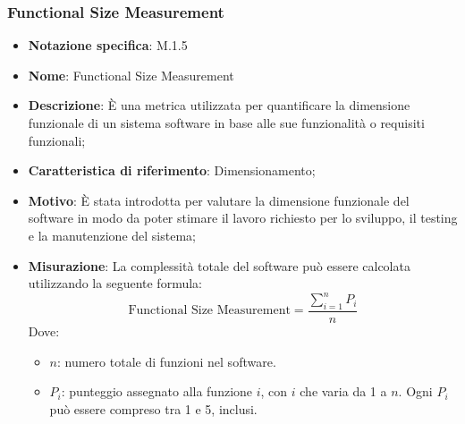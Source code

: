 \subsubsection{Functional Size Measurement}
\begin{itemize}
    \item \textbf{Notazione specifica}: M.1.5
    \item \textbf{Nome}: Functional Size Measurement
    \item \textbf{Descrizione}: È una metrica utilizzata per quantificare la dimensione funzionale di un sistema software in base alle sue funzionalità o requisiti funzionali;
    \item \textbf{Caratteristica di riferimento}: Dimensionamento;
    \item \textbf{Motivo}: È stata introdotta per valutare la dimensione funzionale del software in modo da poter stimare il lavoro richiesto per lo sviluppo, il testing e la manutenzione del sistema;
    \item \textbf{Misurazione}: La complessità totale del software può essere calcolata utilizzando la seguente formula:
    \[
    \text{Functional Size Measurement} = \frac{\sum_{i=1}^{n} P_i}{n}
    \]
    Dove:
    \begin{itemize}
        \item $n$: numero totale di funzioni nel software.
        \item $P_i$: punteggio assegnato alla funzione $i$, con $i$ che varia da 1 a $n$. Ogni $P_i$ può essere compreso tra 1 e 5, inclusi.
    \end{itemize}

\end{itemize}
